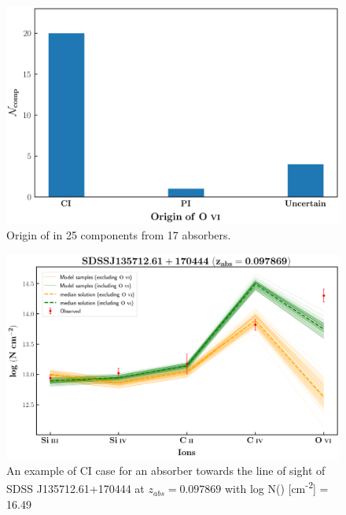 \begin{figure}
    \centering
    \includegraphics[width=\linewidth]{Figures/OVI_cases.png}
    \caption{Origin of  in 25 components from 17  absorbers.}
    \label{fig:OVI-origin}
\end{figure}


\begin{figure}
    \centering
    \includegraphics[width=\linewidth]{Figures/s135712-z=0.097869-compII.png}
    \caption{An example of CI case for an absorber towards the line of sight of SDSS J135712.61+170444 at $z_{abs}=0.097869$ with log N() [cm\textsuperscript{-2}] = 16.49}
    \label{fig:ex-CI}
\end{figure}

